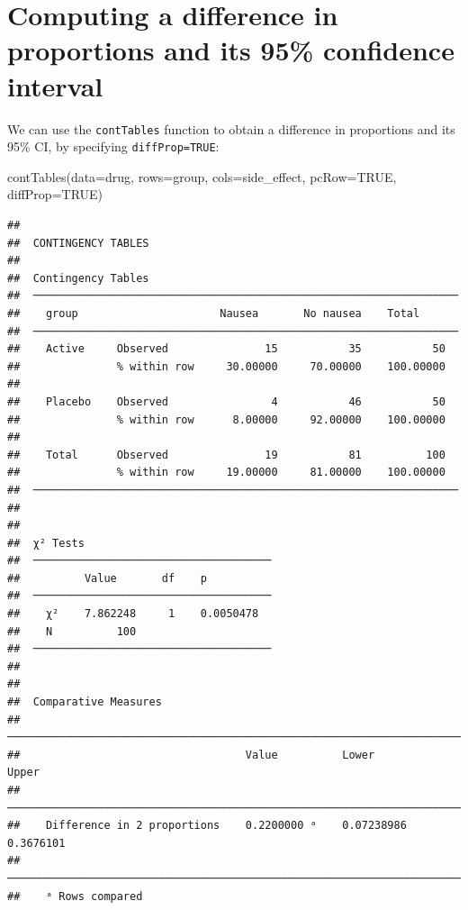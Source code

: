 \documentclass[
]{memoir}
\newenvironment{Shaded}{\begin{snugshade}}{\end{snugshade}}
\newcommand{\AttributeTok}[1]{\textcolor[rgb]{0.77,0.63,0.00}{#1}}
\newcommand{\ConstantTok}[1]{\textcolor[rgb]{0.00,0.00,0.00}{#1}}
\newcommand{\FunctionTok}[1]{\textcolor[rgb]{0.00,0.00,0.00}{#1}}
\newcommand{\NormalTok}[1]{#1}
\begin{document}
\hypertarget{computing-a-difference-in-proportions-and-its-95-confidence-interval}{%
\section{Computing a difference in proportions and its 95\% confidence interval}\label{computing-a-difference-in-proportions-and-its-95-confidence-interval}}

We can use the \texttt{contTables} function to obtain a difference in proportions and its 95\% CI, by specifying \texttt{diffProp=TRUE}:

\begin{Shaded}
\begin{Highlighting}[]
\FunctionTok{contTables}\NormalTok{(}\AttributeTok{data=}\NormalTok{drug, }
           \AttributeTok{rows=}\NormalTok{group, }\AttributeTok{cols=}\NormalTok{side\_effect, }
           \AttributeTok{pcRow=}\ConstantTok{TRUE}\NormalTok{, }\AttributeTok{diffProp=}\ConstantTok{TRUE}\NormalTok{)}
\end{Highlighting}
\end{Shaded}

\begin{verbatim}
## 
##  CONTINGENCY TABLES
## 
##  Contingency Tables                                                 
##  ────────────────────────────────────────────────────────────────── 
##    group                      Nausea       No nausea    Total       
##  ────────────────────────────────────────────────────────────────── 
##    Active     Observed               15           35           50   
##               % within row     30.00000     70.00000    100.00000   
##                                                                     
##    Placebo    Observed                4           46           50   
##               % within row      8.00000     92.00000    100.00000   
##                                                                     
##    Total      Observed               19           81          100   
##               % within row     19.00000     81.00000    100.00000   
##  ────────────────────────────────────────────────────────────────── 
## 
## 
##  χ² Tests                              
##  ───────────────────────────────────── 
##          Value       df    p           
##  ───────────────────────────────────── 
##    χ²    7.862248     1    0.0050478   
##    N          100                      
##  ───────────────────────────────────── 
## 
## 
##  Comparative Measures                                                      
##  ───────────────────────────────────────────────────────────────────────── 
##                                   Value          Lower         Upper       
##  ───────────────────────────────────────────────────────────────────────── 
##    Difference in 2 proportions    0.2200000 ᵃ    0.07238986    0.3676101   
##  ───────────────────────────────────────────────────────────────────────── 
##    ᵃ Rows compared
\end{verbatim}
\end{document}
